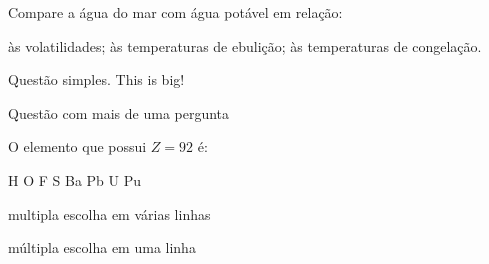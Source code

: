\documentclass[a4paper,addpoints]{exam}
\begin{document}
\begin{multicols}{2}
\begin{questions}
{
\renewcommand*\thechoice{\alph{choice}} 
\renewcommand*\choicelabel{\thechoice)}
%
	Compare a água do mar com água potável em relação:
%	
\begin{choices}
	\choice às volatilidades;
	\choice às temperaturas de ebulição;
	\choice às temperaturas de congelação.
\end{choices}
}


	\question[20] Questão simples.
{\fontsize{0.1cm}{1em}\selectfont This is big!}



\addpoints
\makeemptybox{2cm}

\question[20] Questão com mais de uma pergunta
\noaddpoints %


\addpoints
\question[10] O elemento que possui $Z=92$ é:
\begin{multicols}{3}
	\begin{choices}
		\choice H
		\choice O
		\choice F
		\choice S
		\choice Ba
		\choice Pb
		\choice U
		\choice Pu 🐷
	\end{choices}
\end{multicols}

\question[10] multipla escolha em várias linhas
\begin{choices}
	\choice 1
	\choice 2
	\choice 3
	\choice 4
	\choice 5
\end{choices}

\question[10] múltipla escolha em uma linha\\
\begin{oneparchoices}
\end{oneparchoices}


\end{questions}
\end{multicols}
\end{document}

